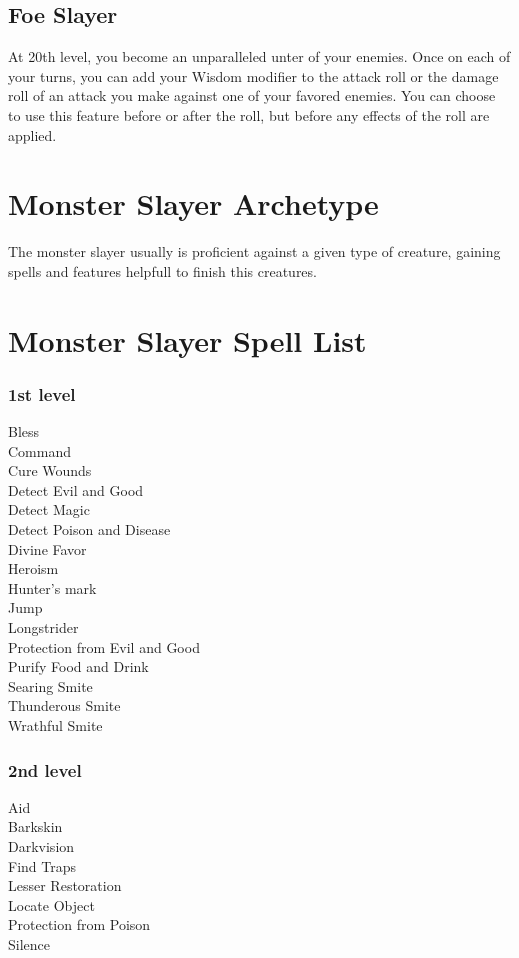 \documentclass[11pt,a4paper,twocolumn]{article}
\begin{document}
	\subsection*{Foe Slayer}
	At 20th level, you become an unparalleled unter of your enemies. Once on each of your turns, you can add your Wisdom modifier to the attack roll or the damage roll of an attack you make against one of your favored enemies. You can choose to use this feature before or after the roll, but before any effects of the roll are	applied.
	
	\section*{Monster Slayer Archetype}
	The monster slayer usually is proficient against a given type of creature, gaining spells and features helpfull to finish this creatures.
	
	
	
	\newpage
	\section*{Monster Slayer Spell List}
	\subsubsection*{1st level}
	Bless \\
	Command \\
	Cure Wounds \\
	Detect Evil and Good \\
	Detect Magic \\
	Detect Poison and Disease \\
	Divine Favor \\
	Heroism \\
	Hunter's mark \\
	Jump \\
	Longstrider \\
	Protection from Evil and Good \\
	Purify Food and Drink \\
	Searing Smite \\
	Thunderous Smite \\
	Wrathful Smite \\
	\subsubsection*{2nd level}
	Aid \\
	Barkskin \\
	Darkvision \\
	Find Traps \\
	Lesser Restoration \\
	Locate Object \\
	Protection from Poison \\
	Silence \\
\end{document}
